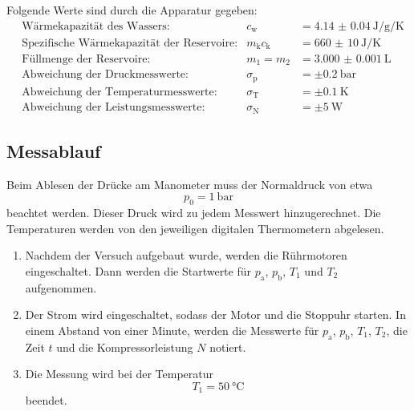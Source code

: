 Folgende Werte sind durch die Apparatur gegeben:
\begin{align}
  & \text{Wärmekapazität des Wassers:} & c_\text{w} & =\SI{4.14(4)}{\joule\per\gram\per\kelvin} \\
  & \text{Spezifische Wärmekapazität der Reservoire:} & m_\text{k}c_\text{k} & =\SI{660(10)}
  {\joule\per\kelvin} \\
  & \text{Füllmenge der Reservoire:} & m_1 = m_2 & = \SI{3.000(1)}{\liter} \\
  & \text{Abweichung der Druckmesswerte:} & \sigma_\text{p} & =\pm \SI{0.2}
  {\bar} \\
  & \text{Abweichung der Temperaturmesswerte:} & \sigma_\text{T} & =\pm
  \SI{0.1}{\kelvin} \\
  & \text{Abweichung der Leistungsmesswerte:} & \sigma_\text{N} & =\pm \SI{5}
  {\watt}
\end{align}

\subsection{Messablauf}

Beim Ablesen der Drücke am Manometer muss der Normaldruck von etwa
\begin{equation}
  p_0 = \SI{1}{\bar}
\end{equation}
beachtet werden. Dieser Druck wird zu jedem Messwert hinzugerechnet.
Die Temperaturen werden von den jeweiligen digitalen Thermometern abgelesen.

\begin{enumerate}

\item Nachdem der Versuch aufgebaut wurde, werden die Rührmotoren eingeschaltet.
Dann werden die Startwerte für $p_\text{a}$, $p_\text{b}$, $T_1$ und $T_2$
aufgenommen.

\item Der Strom wird eingeschaltet, sodass der Motor und die Stoppuhr starten.
In einem Abstand von einer Minute, werden die Messwerte für $p_\text{a}$,
$p_\text{b}$, $T_1$, $T_2$, die Zeit $t$ und die Kompressorleistung $N$ notiert.

\item Die Messung wird bei der Temperatur
\begin{equation}
  T_1 = \SI{50}{\celsius}
\end{equation}
beendet.

\end{enumerate}
